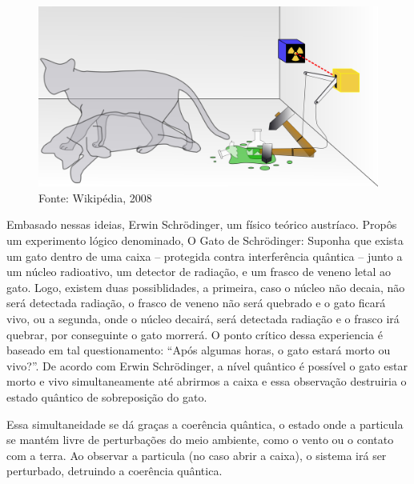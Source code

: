\documentclass[
	12pt,				%
	oneside,			%
	a4paper,			%
	english,			%
	french,				%
	spanish,			%
	brazil,				%
	]{abntex2}
\begin{document}
\begin{figure}[ht!]
	\centering \includegraphics[width=\linewidth]{sobreposicao.jpg}
	\caption{Fonte: Wikipédia, 2008}
	\label{fig:gato}
\end{figure}

Embasado nessas ideias, Erwin Schrödinger, um físico teórico austríaco. Propôs um experimento lógico denominado, O Gato de Schrödinger: Suponha que exista um gato dentro de uma caixa – protegida contra interferência quântica – junto a um núcleo radioativo, um detector de radiação,  e um frasco de veneno letal ao gato. Logo, existem duas possiblidades, a primeira, caso o núcleo não decaia, não será detectada radiação, o frasco de veneno não será quebrado e o gato ficará vivo, ou a segunda, onde o núcleo decairá, será detectada radiação e o frasco irá quebrar, por conseguinte o gato morrerá. O ponto crítico dessa experiencia é baseado em tal questionamento: “Após algumas horas, o gato estará morto ou vivo?”. De acordo com Erwin Schrödinger, a nível quântico é possível o gato estar morto e vivo simultaneamente até abrirmos a caixa e essa observação destruiria o estado quântico de sobreposição do gato.

Essa simultaneidade se dá graças a coerência quântica, o estado onde a particula se mantém livre de perturbações do meio ambiente, como o vento ou o contato com a terra. Ao observar a particula (no caso abrir a caixa), o sistema irá ser perturbado, detruindo a coerência quântica.
\end{document}

